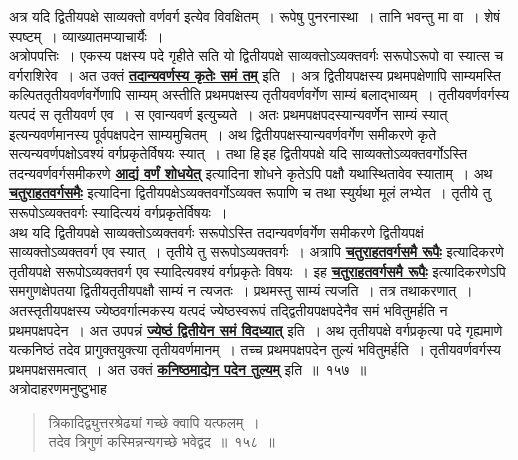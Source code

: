 \documentclass[11pt, openany]{book}
\begin{document}
 अत्र यदि द्वितीयपक्षे साव्यक्तो वर्णवर्ग इत्येव विवक्षितम्~। रूपेषु
पुनरनास्था~। तानि भवन्तु मा वा~। शेषं स्पष्टम्~। व्याख्यातमप्याचार्यैः~।\\

\vspace{-4mm}
अत्रोपपत्तिः~। एकस्य पक्षस्य पदे गृहीते सति यो द्वितीयपक्षे
साव्यक्तोऽव्यक्तवर्गः सरूपोऽरूपो वा स्यात्स च वर्गराशिरेव~। अत उक्तं \hyperref[157]{\textbf{तदान्यवर्णस्य कृतेः समं तम्}} इति~। अत्र द्वितीयपक्षस्य प्रथमपक्षेणापि साम्यमस्ति
कल्पिततृतीयवर्णवर्गेणापि साम्यम् अस्तीति प्रथमपक्षस्य तृतीयवर्णवर्गेण साम्यं
बलाद्भाव्यम्~।
तृतीयवर्णवर्गस्य यत्पदं स तृतीयवर्ण एव~। स एवान्यवर्ण इत्युच्यते~। अतः
प्रथमपक्षपदस्यान्यवर्णेन साम्यं स्यात् इत्यन्यवर्णमानस्य पूर्वपक्षपदेन
साम्यमुचितम्~। अथ द्वितीयपक्षस्यान्यवर्णवर्गेण समीकरणे कृते \,सत्यन्यवर्णपक्षोऽवश्यं वर्गप्रकृतेर्विषयः 
स्यात्~। तथा हि\textendash \,इह द्वितीयपक्षे यदि साव्यक्तोऽव्यक्तवर्गोऽस्ति
तदन्यवर्णवर्गसमीकरणे \hyperref[134]{\textbf{आद्यं वर्णं शोधयेत्}} इत्यादिना शोधने कृतेऽपि पक्षौ
यथास्थितावेव
स्याताम्~। अथ \hyperref[116]{\textbf{चतुराहतवर्गसमैः}} इत्यादिना
द्वितीयपक्षेऽव्यक्तवर्गोऽव्यक्त रूपाणि
च तथा स्युर्यथा मूलं लभ्येत~। तृतीये तु सरूपोऽव्यक्तवर्गः स्यादित्ययं
वर्गप्रकृतेर्विषयः~।\\

\vspace{-4mm}
अथ यदि द्वितीयपक्षे साव्यक्तोऽव्यक्तवर्गः सरूपोऽस्ति तदान्यवर्णवर्गेण
समीकरणे द्वितीयपक्षं साव्यक्तोऽव्यक्तवर्ग एव स्यात्~। तृतीये तु
सरूपोऽव्यक्तवर्गः~। अत्रापि \hyperref[116]{\textbf{चतुराहतवर्गसमै रूपैः}} इत्यादिकरणे तृतीयपक्षे सरूपोऽव्यक्तवर्ग एव
स्यादित्यवश्यं वर्गप्रकृतेः विषयः~। इह \hyperref[116]{\textbf{चतुराहतवर्गसमै रूपैः}} इत्यादिकरणेऽपि
समगुणक्षेपतया द्वितीयतृतीयपक्षौ साम्यं न त्यजतः~। प्रथमस्तु साम्यं त्यजति~।
\newpage
\noindent तत्र तथाकरणात्~। अतस्तृतीयपक्षस्य ज्येष्ठवर्गात्मकस्य यत्पदं
ज्येष्ठस्वरूपं तद्द्वितीयपक्षपदेनैव समं भवितुमर्हति न प्रथमपक्षपदेन~। अत उपपन्नं \hyperref[157]{\textbf{ज्येष्ठं द्वितीयेन समं विदध्यात्}} इति~। अथ तृतीयपक्षे वर्गप्रकृत्या पदे गृह्यमाणे यत्कनिष्ठं
तदेव प्रागुक्तयुक्त्या तृतीयवर्णमानम्~। तच्च प्रथमपक्षपदेन तुल्यं भवितुमर्हति~। तृतीयवर्णवर्गस्य प्रथमपक्षसमत्वात्~। अत उक्तं \hyperref[157]{\textbf{कनिष्ठमाद्येन पदेन तुल्यम्}} इति~॥~१५७~॥~\\

\vspace{-2mm}
 अत्रोदाहरणमनुष्टुभाह\textendash
\begin{quote}
    \eg 
      त्रिकादिद्व्युत्तरश्रेढ्यां गच्छे क्वापि यत्फलम्~।\\
 तदेव त्रिगुणं कस्मिन्नन्यगच्छे भवेद्वद~॥~१५८~॥
\end{quote}
\end{document}
